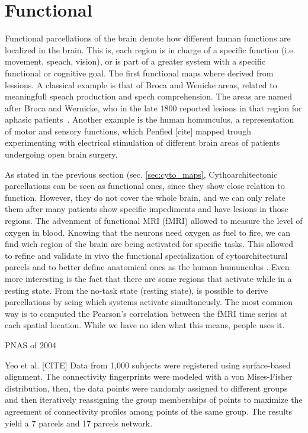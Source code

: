\section{Functional}
Functional parcellations of the brain denote how different human functions 
are localized in the brain. This is, each region is in charge of a specific
function (i.e. movement, speach, vision), or is part of a greater system with
a specific functional or cognitive goal. The first functional maps where derived
from lessions. A classical example is that of Broca and Wenicke areas, related
to meaningfull speach production and spech comprehension. The areas are named
after Broca and Wernicke, who in the late 1800 reported lesions in
that region for aphasic patients~\cite{Johns}. Another example is the human homunculus,
a representation of motor and sensory functions, which Penfied [cite] mapped
trough experimenting with electrical stimulation of different brain areas of
patients undergoing open brain surgery.

As stated in the previous section (sec. \ref{sec:cyto_maps}, Cythoarchitectonic
parcellations can be seen as functional ones, since they show close relation 
to function. However, they do not cover the whole brain, and we can only relate
them after many patients show specific impediments and have lesions in those
regions. The advenment of functional MRI (fMRI) allowed to measure the level of
oxygen in blood. Knowing that the neurons need oxygen as fuel to fire, we can
find wich region of the brain are being activated for specific tasks. This
allowed to refine and validate in vivo the functional specialization of 
cytoarchitectural parcels and to better define anatomical ones as the human
humunculus \cite{Lashkari2010, Michel2011}. Even more interesting is the fact
that there are some regions that activate while in a resting state. From the
no-task state (resting state), is possible to derive parcellations by seing
which systems activate simultaneusly. The most common way is to computed the
Pearson's correlation between the fMRI time series at each spatial location.
While we have no idea what this means, people uses it. 

PNAS of 2004 \cite{Johansen-Berg2004}


Yeo et al. [CITE] 
Data from 1,000 subjects were registered using surface-based alignment.
The connectivity fingerprints were modeled with a von Mises-Fisher distribution,
then, the data points were randomly assigned to different groups and then
iteratively reassigning the group memberships of points to maximize the
agreement of connectivity profiles among points of the same group. The results
yield a 7 parcels and 17 parcels network.

